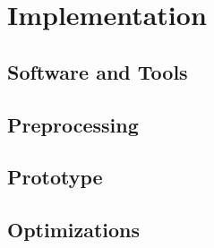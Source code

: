 \chapter{Implementation}
\section{Software and Tools}
\section{Preprocessing}
\section{Prototype}
\section{Optimizations}
